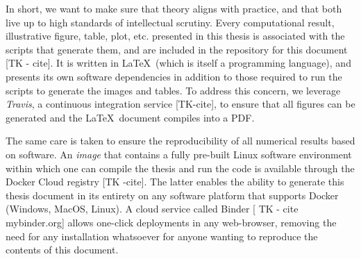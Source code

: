 In short, we want to make sure that theory aligns with practice, and that both live up to high standards of intellectual scrutiny.
Every computational result, illustrative figure, table, plot, etc. presented in this thesis is associated with the scripts that generate them, and are included in the  repository for this document [TK - cite].
It is written in \LaTeX~(which is itself a programming language), and presents its own software dependencies in addition to those required to run the scripts to generate the images and tables.
To address this concern, we leverage \emph{Travis}, a continuous integration service [TK-cite], to ensure that all figures can be generated and the \LaTeX\, document compiles into a PDF.

The same care is taken to ensure the reproducibility of all numerical results based on software.
An \emph{image} that contains a fully pre-built Linux software environment within which one can compile the thesis and run the code is available through the Docker Cloud registry [TK -cite].
The latter enables the ability to generate this thesis document in its entirety on any software platform that supports Docker (Windows, MacOS, Linux).
A cloud service called Binder [ TK - cite mybinder.org] allows one-click deployments in any web-browser, removing the need for any installation whatsoever for anyone wanting to reproduce the contents of this document.


